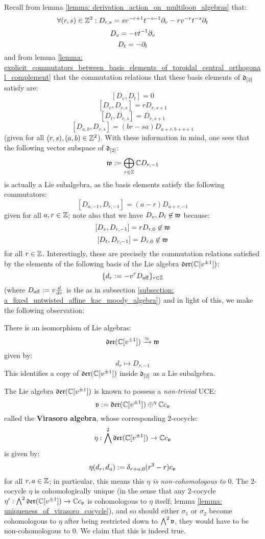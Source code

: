         Recall from lemma \ref{lemma: derivation_action_on_multiloop_algebras} that:
            $$\forall (r, s) \in \mathbb{Z}^2: D_{r, s} = s v^{-r + 1} t^{-s - 1} \partial_v - r v^{-r} t^{-s} \partial_t$$
            $$D_v = -v t^{-1} \partial_v$$
            $$D_t = -\partial_t$$
        and from lemma \ref{lemma: explicit_commutators_between_basis_elements_of_toroidal_central_orthogonal_complement} that the commutation relations that these basis elements of $\mathfrak{d}_{[2]}$ satisfy are:
            $$[D_v, D_t] = 0$$
            $$[D_v, D_{r, s}] = r D_{r, s + 1}$$
            $$[D_t, D_{r, s}] = D_{r, s + 1}$$
            $$[D_{a, b}, D_{r, s}] = (br - sa) D_{a + r, b + s + 1}$$
        (given for all $(r, s), (a, b) \in \mathbb{Z}^2$). With these information in mind, one sees that the following vector subspace of $\mathfrak{d}_{[2]}$:
            $$\mathfrak{w} := \bigoplus_{r \in \mathbb{Z}} \mathbb{C} D_{r, -1}$$
        is actually a Lie subalgebra, as the basis elements satisfy the following commutators:
            $$[D_{a, -1}, D_{r, -1}] = (a - r) D_{a + r, -1}$$
        given for all $a, r \in \mathbb{Z}$; note also that we have $D_v, D_t \not \in \mathfrak{w}$ because:
            $$[D_v, D_{r, -1}] = r D_{r, 0} \not \in \mathfrak{w}$$
            $$[D_t, D_{r, -1}] = D_{r, 0} \not \in \mathfrak{w}$$    
        for all $r \in \mathbb{Z}$. Interestingly, these are precisely the commutation relations satisfied by the elements of the following basis of the Lie algebra $\mathfrak{der}(\mathbb{C}[v^{\pm 1}])$:
            $$\{ d_r := -v^r D_{\mathrm{aff}} \}_{r \in \mathbb{Z}}$$
        (where $D_{\mathrm{aff}} := v \frac{d}{dv}$ is the  as in subsection \ref{subsection: a_fixed_untwisted_affine_kac_moody_algebra}) and in light of this, we make the following observation:
        \begin{lemma}
            There is an isomorphism of Lie algebras:
                $$\mathfrak{der}(\mathbb{C}[v^{\pm 1}]) \xrightarrow[]{\simeq} \mathfrak{w}$$
            given by:
                $$d_r \mapsto D_{r, -1}$$
            This identifies a copy of $\mathfrak{der}(\mathbb{C}[v^{\pm 1}])$ inside $\mathfrak{d}_{[2]}$ as a Lie subalgebra. 
        \end{lemma}

        The Lie algebra $\mathfrak{der}(\mathbb{C}[v^{\pm 1}])$ is known to possess a \textit{non-trivial} UCE:
            $$\mathfrak{v} := \mathfrak{der}(\mathbb{C}[v^{\pm 1}]) \oplus^{\eta} \mathbb{C} c_{\mathfrak{v}}$$
        called the \textbf{Virasoro algebra}, whose corresponding $2$-cocycle:
            $$\eta: \bigwedge^2 \mathfrak{der}(\mathbb{C}[v^{\pm 1}]) \to \mathbb{C} c_{\mathfrak{v}}$$
        is given by:
            $$\eta(d_r, d_a) := \delta_{r + a, 0} (r^3 - r) c_{\mathfrak{v}}$$
        for all $r, a \in \mathbb{Z}$; in particular, this means this \textit{$\eta$ is non-cohomologous to $0$}. The $2$-cocycle $\eta$ is cohomologically unique (in the sense that any $2$-cocycle $\eta': \bigwedge^2 \mathfrak{der}(\mathbb{C}[v^{\pm 1}]) \to \mathbb{C} c_{\mathfrak{v}}$ is cohomologous to $\eta$ itself; lemma \ref{lemma: uniqueness_of_virasoro_cocycle}), and so should either $\sigma_1$ or $\sigma_2$ become cohomologous to $\eta$ after being restricted down to $\bigwedge^2 \mathfrak{v}$, they would have to be non-cohomologous to $0$. We claim that this is indeed true.

